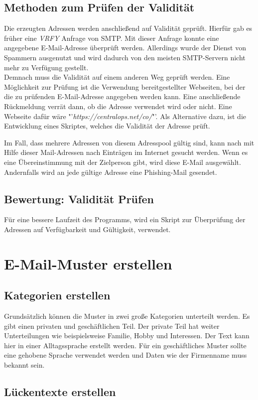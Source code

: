 	\subsection{Methoden zum Prüfen der Validität}
	Die erzeugten Adressen werden anschließend auf Validität geprüft. Hierfür gab es früher eine \textit{VRFY} Anfrage von SMTP. Mit dieser Anfrage konnte eine angegebene E-Mail-Adresse überprüft werden. Allerdings wurde der Dienst von Spammern ausgenutzt und wird dadurch von den meisten SMTP-Servern nicht mehr zu Verfügung gestellt.\cite{balduzzi2010abusing}\\
	Demnach muss die Validität auf einem anderen Weg geprüft werden. Eine Möglichkeit zur Prüfung ist die Verwendung bereitgestellter Webseiten, bei der die zu prüfenden E-Mail-Adresse angegeben werden kann. Eine anschließende Rückmeldung verrät dann, ob die Adresse verwendet wird oder nicht. Eine Webseite dafür wäre "'\textit{https://centralops.net/co/}"'. Als Alternative dazu, ist die Entwicklung eines Skriptes, welches die Validität der Adresse prüft.
	
	Im Fall, dass mehrere Adressen von diesem Adresspool gültig sind, kann nach mit Hilfe dieser Mail-Adressen nach Einträgen im Internet gesucht werden. Wenn es eine Übereinstimmung mit der Zielperson gibt, wird diese E-Mail ausgewählt. Andernfalls wird an jede gültige Adresse eine Phishing-Mail gesendet. 
	
	\subsection{Bewertung: Validität Prüfen}
	Für eine bessere Laufzeit des Programms, wird ein Skript zur Überprüfung der Adressen auf Verfügbarkeit und Gültigkeit, verwendet.
	
\section{E-Mail-Muster erstellen}

	\subsection{Kategorien erstellen}
	Grundsätzlich können die Muster in zwei große Kategorien unterteilt werden. Es gibt einen privaten und geschäftlichen Teil. Der private Teil hat weiter Unterteilungen wie beispielsweise Familie, Hobby und Interessen. Der Text kann hier in einer Alltagssprache erstellt werden. Für ein geschäftliches Muster sollte eine gehobene Sprache verwendet werden und Daten wie der Firmenname muss bekannt sein. 
	
	\subsection{Lückentexte erstellen}
	